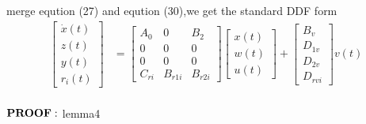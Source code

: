 \documentclass[twocolumn]{autart}    %
\begin{document}
merge eqution (27) and eqution (30),we get the standard DDF form
\begin{equation}
    \begin{aligned}
        \begin{bmatrix}
            \dot{x}(t) \\
            z(t) \\
            y(t) \\
            r_{i}(t)
        \end{bmatrix} & = \begin{bmatrix}
            A_{0} & 0 & B_{2}\\
            0 & 0 & 0\\
            0 & 0 & 0\\
            C_{ri} & B_{r1i} & B_{r2i}
        \end{bmatrix}\begin{bmatrix}
            x(t) \\
            w(t) \\
            u(t) 
        \end{bmatrix} + \begin{bmatrix}
            B_{v} \\
            D_{1v} \\
            D_{2v} \\
            D_{rvi}
        \end{bmatrix}v(t)\\
    \end{aligned}
\end{equation}


$\bold{PROOF:}$ lemma4\\
\end{document}
